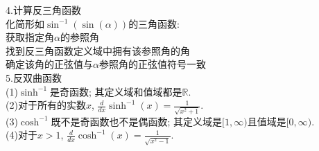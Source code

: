 4.计算反三角函数\\
化简形如$\sin^{-1}(\sin(\alpha))$的三角函数:\\
\phantom{(1)}获取指定角$\alpha$的参照角\\
\phantom{(1)}找到反三角函数定义域中拥有该参照角的角\\
\phantom{(1)}确定该角的正弦值与$\alpha$参照角的正弦值符号一致\\[2ex]

5.反双曲函数\\
(1)$\sinh^{-1}$是奇函数; 其定义域和值域都是$\mathbb{R}$.\\[1ex]
(2)对于所有的实数$x$, $\displaystyle\frac{d}{dx}\sinh^{-1}(x)=\frac{1}{\sqrt{x^2+1}}$.\\[1ex]
(3)$\cosh^{-1}$既不是奇函数也不是偶函数; 其定义域是$[1,\infty)$且值域是$[0,\infty)$.\\[1ex]
(4)对于$x>1$, $\displaystyle\frac{d}{dx}\cosh^{-1}(x)=\frac{1}{\sqrt{x^2-1}}$.\\[1ex]
